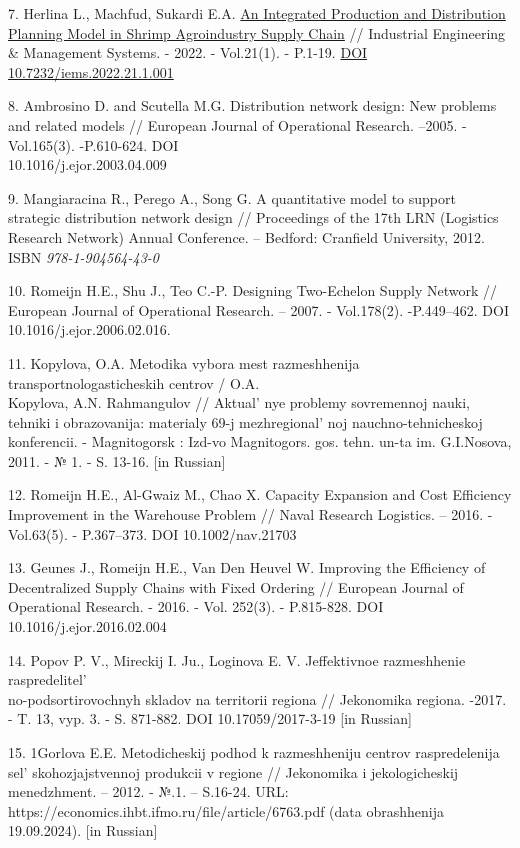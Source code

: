 \begin{references}
7. Herlina L., Machfud, Sukardi E.A.
\href{http://www.iemsjl.org/journal/article.php?code=82679}{An
Integrated Production and Distribution Planning Model in Shrimp
Agroindustry Supply Chain} // Industrial Engineering \& Management
Systems. - 2022. - Vol.21(1). - P.1-19.
\href{https://doi.org/10.7232/iems.2022.21.1.001}{DOI
10.7232/iems.2022.21.1.001}

8. Ambrosino D. and Scutella M.G. Distribution network design: New
problems and related models // European Journal of Operational
Research. --2005. -Vol.165(3). -P.610-624. DOI\\
10.1016/j.ejor.2003.04.009

9. Mangiaracina R., Perego A., Song G. A quantitative model to support
strategic distribution network design // Proceedings of the 17th LRN
(Logistics Research Network) Annual Conference. -- Bedford: Cranfield
University, 2012. ISBN \emph{978-1-904564-43-0}

10. Romeijn H.E., Shu J., Teo C.-P. Designing Two-Echelon Supply Network
// European Journal of Operational Research. -- 2007. - Vol.178(2).
-P.449--462. DOI 10.1016/j.ejor.2006.02.016.

11. Kopylova, O.A. Metodika vybora mest razmeshhenija
transportnologasticheskih centrov / O.A. \\Kopylova, A.N. Rahmangulov //
Aktual' nye problemy sovremennoj nauki, tehniki i
obrazovanija: materialy 69-j mezhregional' noj
nauchno-tehnicheskoj konferencii. - Magnitogorsk : Izd-vo Magnitogors.
gos. tehn. un-ta im. G.I.Nosova, 2011. - № 1. - S. 13-16. {[}in
Russian{]}

12. Romeijn H.E., Al-Gwaiz M., Chao X. Capacity Expansion and Cost
Efficiency Improvement in the Warehouse Problem // Naval Research
Logistics. -- 2016. - Vol.63(5). - P.367--373. DOI 10.1002/nav.21703

13. Geunes J., Romeijn H.E., Van Den Heuvel W. Improving the Efficiency of
Decentralized Supply Chains with Fixed Ordering // European Journal of
Operational Research. - 2016. - Vol. 252(3). - P.815-828. DOI
10.1016/j.ejor.2016.02.004

14. Popov P. V., Mireckij I. Ju., Loginova E. V. Jeffektivnoe razmeshhenie
raspredelitel' \\no-podsortirovochnyh skladov na
territorii regiona // Jekonomika regiona. -2017. - T. 13, vyp. 3. - S.
871-882. DOI 10.17059/2017-3-19 {[}in Russian{]}

15. 1Gorlova E.E. Metodicheskij podhod k razmeshheniju centrov
raspredelenija sel' skohozjajstvennoj produkcii v
regione // Jekonomika i jekologicheskij menedzhment. -- 2012. - №.1.
-- S.16-24. URL: https://economics.ihbt.ifmo.ru/file/article/6763.pdf
(data obrashhenija 19.09.2024). {[}in Russian{]}


\end{references}

